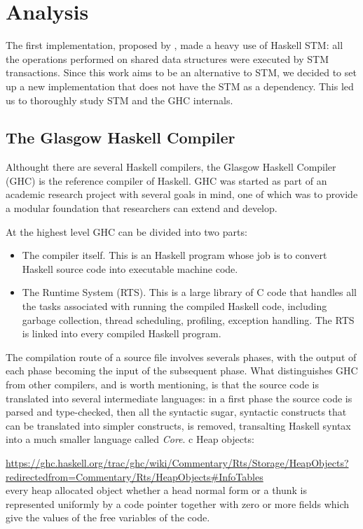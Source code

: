
\chapter{Analysis}

The first implementation, proposed by \citet{Toneguzzo}, made a heavy use of Haskell STM: all the operations performed on shared data structures were executed by STM transactions. Since this work aims to be an alternative to STM, we decided to set up a new implementation that does not have the STM as a dependency. This led us to thoroughly study STM and the GHC internals.


\section{The Glasgow Haskell Compiler}
Althought there are several Haskell compilers, the Glasgow Haskell Compiler (GHC) is the reference compiler of Haskell. GHC was started as part of an academic research project with several goals in mind, one of which was to provide a modular foundation that researchers can extend and develop.

At the highest level GHC can be divided into two parts:
\begin{itemize}
 \item The compiler itself. This is an Haskell program whose job is to convert Haskell source code into executable machine code.
 \item The Runtime System (RTS). This is a large library of C code that handles all the tasks associated with running the compiled Haskell code, including garbage collection, thread scheduling, profiling, exception handling. The RTS is linked into every compiled Haskell program.
 \end{itemize}
The compilation route of a source file involves severals phases, with the output of each phase becoming the input of the subsequent phase. What distinguishes GHC from other compilers, and is worth mentioning, is that the source code is translated into several intermediate languages: in a first phase the source code is parsed and type-checked, then all the syntactic sugar, \ie syntactic constructs that can be translated into simpler constructs, is removed, transalting Haskell syntax into a much smaller language called \emph{Core}. 
c\newline\newline
Heap objects:

\url{https://ghc.haskell.org/trac/ghc/wiki/Commentary/Rts/Storage/HeapObjects?redirectedfrom=Commentary/Rts/HeapObjects#InfoTables}
\\
every heap allocated object whether a head normal form or a thunk  is represented uniformly by a code pointer together with zero or more fields which give the values of the free variables of the code. \cite{export:67083}

